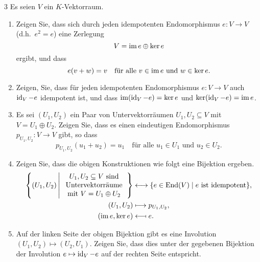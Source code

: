 

\begin{question}[subtitle = Äquivalenz von idempotenten Endomorphismen und direkten Summen]{3}
  Es seien $V$ ein $K$-Vektorraum.
  \begin{enumerate}[leftmargin=*]
    \item
      Zeigen Sie, dass sich durch jeden idempotenten Endomorphismus $e \colon V \to V$ (d.h.\ $e^2 = e$) eine Zerlegung
      \[
        V = \operatorname{im} e \oplus \ker e
      \]
      ergibt, und dass
      \[
        e(v + w) = v
        \quad
        \text{für alle $v \in \operatorname{im} e$ und $w \in \ker e$}.
      \]
    \item
      Zeigen, Sie, dass für jeden idempotenten Endomorphismus $e \colon V \to V$ auch $\operatorname{id}_V - e$ idempotent ist, und dass $\operatorname{im} (\operatorname{id}_V - e) = \ker e$ und $\ker (\operatorname{id}_V - e) = \operatorname{im} e$.
    \item
      Es sei $(U_1, U_2)$ ein Paar von Untervektorräumen $U_1, U_2 \subseteq V$ mit $V = U_1 \oplus U_2$.
      Zeigen Sie, dass es einen eindeutigen Endomorphismus $p_{U_1, U_2} \colon V \to V$ gibt, so dass
      \[
          p_{U_1, U_2}(u_1 + u_2)
        = u_1
        \quad
        \text{für alle $u_1 \in U_1$ und $u_2 \in U_2$}.
      \]
    \item
      Zeigen Sie, dass die obigen Konstruktionen wie folgt eine Bijektion ergeben.
      \begin{align*}
        \left\{
          (U_1, U_2)
          \,\middle|\,
          \begin{tabular}{c}
            $U_1, U_2 \subseteq V$ sind \\
            Untervektorräume            \\
            mit $V = U_1 \oplus U_2$
          \end{tabular}
        \right\}
        &\longleftrightarrow
        \{ e \in \End(V) \mid \text{$e$ ist idempotent} \},
      \\
        (U_1, U_2) &\longmapsto p_{U_1, U_2},
      \\
        (\im e, \ker e) &\longmapsfrom e.
      \end{align*}
    \item
      Auf der linken Seite der obigen Bijektion gibt es eine Involution $(U_1, U_2) \mapsto (U_2, U_1)$.
      Zeigen Sie, dass dies unter der gegebenen Bijektion der Involution $e \mapsto \operatorname{id}_V - e$ auf der rechten Seite entspricht.
  \end{enumerate}
\end{question}


